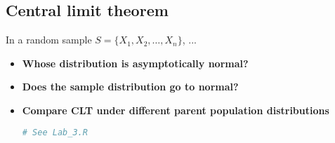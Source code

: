 \documentclass[10pt]{article}
\begin{document}
\subsection{Central limit theorem}
In a random sample $S = \{ X_1, X_2,\ldots, X_n \}$, ...
\begin{itemize}
	\item {\bf Whose distribution is asymptotically normal?}
	\item {\bf Does the sample distribution go to normal?}
	\item {\bf Compare CLT under different parent population distributions}
\begin{lstlisting}[style=displaycode, language=R]
	# See Lab_3.R
\end{lstlisting}
\end{itemize}
\end{document}
